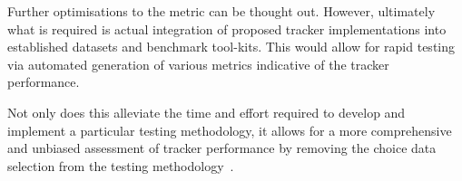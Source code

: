 Further optimisations to the metric can be thought out. However, ultimately what
is required is actual integration of proposed tracker implementations into established
datasets and benchmark tool-kits. This would allow for rapid testing via
automated generation of various metrics indicative of the tracker performance.

Not only does this alleviate the time and effort required to develop and
implement a particular testing methodology, it allows for a more comprehensive
and unbiased assessment of tracker performance by removing the choice data
selection from the testing methodology~\cite{Bei}.



